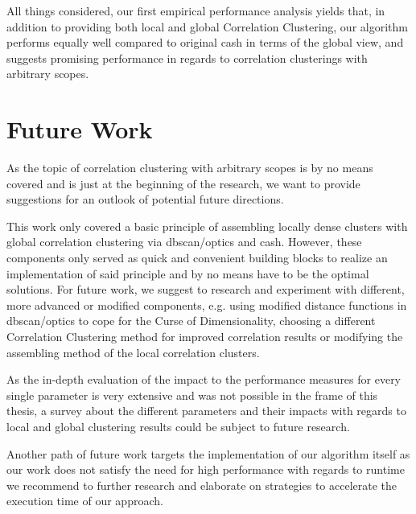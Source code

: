 All things considered, our first empirical performance analysis yields that, in addition to providing both local and global Correlation Clustering, our algorithm performs equally well compared to original \gls{cash} in terms of the global view, and suggests promising performance in regards to correlation clusterings with arbitrary scopes.

\chapter{Future Work}\label{ch:futurework}
As the topic of correlation clustering with arbitrary scopes is by no means covered and is just at the beginning of the research, we want to provide suggestions for an outlook of potential future directions. 

This work only covered a basic principle of assembling locally dense clusters with global correlation clustering via \gls{dbscan}/\gls{optics} and \gls{cash}. However, these components only served as quick and convenient building blocks to realize an implementation of said principle and by no means have to be the optimal solutions. For future work, we suggest to research and experiment with different, more advanced or modified components, e.g. using modified distance functions in \gls{dbscan}/\gls{optics} to cope for the Curse of Dimensionality, choosing a different Correlation Clustering method for improved correlation results or modifying the assembling method of the local correlation clusters.

As the in-depth evaluation of the impact to the performance measures for every single parameter is very extensive and was not possible in the frame of this thesis, a survey about the different parameters and their impacts with regards to local and global clustering results could be subject to future research.

Another path of future work targets the implementation of our algorithm itself as our work does not satisfy the need for high performance with regards to runtime we recommend to further research and elaborate on strategies to accelerate the execution time of our approach.

